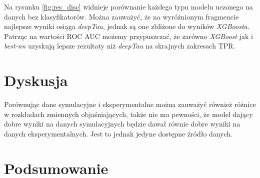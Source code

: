 \documentclass{pracalicmgr}
\begin{document}
	Na rysunku \ref{fig:res_disc} widnieje porównanie każdego typu modelu uczonego na danych bez klasyfikatorów. Można zauważyć, że na wyróżnionym fragmencie najlepsze wyniki osiąga \textit{deepTau}, jednak są one zbliżone do wyników \textit{XGBoosta}. Patrząc na wartości ROC AUC możemy przypuszczać, że zarówno \textit{XGBoost} jak i \textit{best-nn} uzyskują lepsze rezultaty niż \textit{deepTau} na skrajnych zakresach TPR.
	
    
    \chapter{Dyskusja}
    
	Porównując dane symulacyjne i eksperymentalne można zauważyć również różnice w rozkładach zmiennych objaśniających, także nie ma pewności, że model dający dobre wyniki na danych symulacyjnych będzie dawał równie dobre wyniki na danych eksperymentalnych.	Jest to jednak jedyne dostępne źródło danych.	
	
    \chapter{Podsumowanie}
    
    \printbibliography
    
\end{document}
